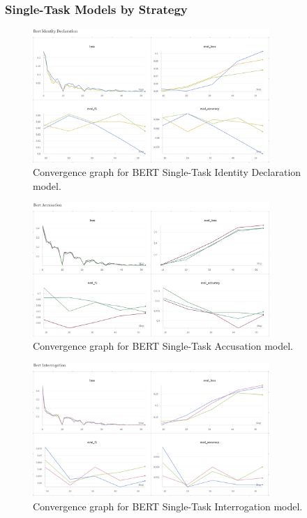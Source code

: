 \documentclass{article}
\begin{document}
\subsubsection{Single-Task Models by Strategy}
\begin{figure}[H]
    \centering
    \includegraphics[width=0.8\textwidth]{convergence_graphs/bert_identity_declaration.png}
    \caption{Convergence graph for BERT Single-Task Identity Declaration model.}
    \label{fig:bert_identity_declaration}
\end{figure}

\begin{figure}[H]
    \centering
    \includegraphics[width=0.8\textwidth]{convergence_graphs/bert_accusation.png}
    \caption{Convergence graph for BERT Single-Task Accusation model.}
    \label{fig:bert_accusation}
\end{figure}

\begin{figure}[H]
    \centering
    \includegraphics[width=0.8\textwidth]{convergence_graphs/bert_interrogation.png}
    \caption{Convergence graph for BERT Single-Task Interrogation model.}
    \label{fig:bert_interrogation}
\end{figure}
\end{document}
